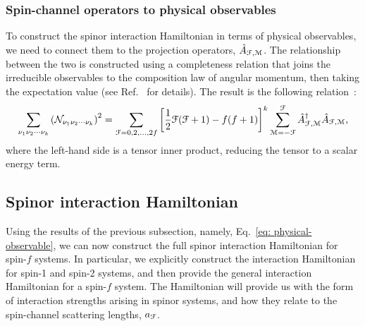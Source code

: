 \subsubsection{Spin-channel operators to physical observables}
To construct the spinor interaction Hamiltonian in terms of physical
observables, we need to connect them to the projection operators,
\(\hat{A}_{\EuScript{F}, \EuScript{M}}\).
The relationship between the two is constructed using a completeness relation
that joins the irreducible observables to the composition law of angular
momentum, then taking the expectation value (see Ref.~\cite{Kawaguchi2012} for
details).
The result is the following relation~\cite{Kawaguchi2012, Symes2019}:
\begin{align}\label{eq: physical-observable}
    \sum_{\nu_1\nu_2\cdots\nu_k}{(\mathcal{N}_{\nu_1\nu_2\cdots\nu_k})}^2 =
    \sum_{\EuScript{F} = 0, 2, \ldots, 2f}{\left[
        \frac{1}{2}\EuScript{F}(\EuScript{F} + 1) - f(f+1)
    \right]}^k \sum_{\EuScript{M} = -\EuScript{F}}^{\EuScript{F}}
    \hat{A}^\dagger_{\EuScript{F}, \EuScript{M}}
    \hat{A}_{\EuScript{F}, \EuScript{M}},
\end{align}
where the left-hand side is a tensor inner product, reducing the tensor to a
scalar energy term.

\subsection{Spinor interaction Hamiltonian}
Using the results of the previous subsection, namely,
Eq.~\eqref{eq: physical-observable}, we can now construct the full spinor
interaction Hamiltonian for spin-\(f\) systems.
In particular, we explicitly construct the interaction Hamiltonian for spin-1
and spin-2 systems, and then provide the general interaction Hamiltonian for
a spin-\(f\) system.
The Hamiltonian will provide us with the form of interaction strengths arising
in spinor systems, and how they relate to the spin-channel scattering lengths,
\(a_\EuScript{F}\).

